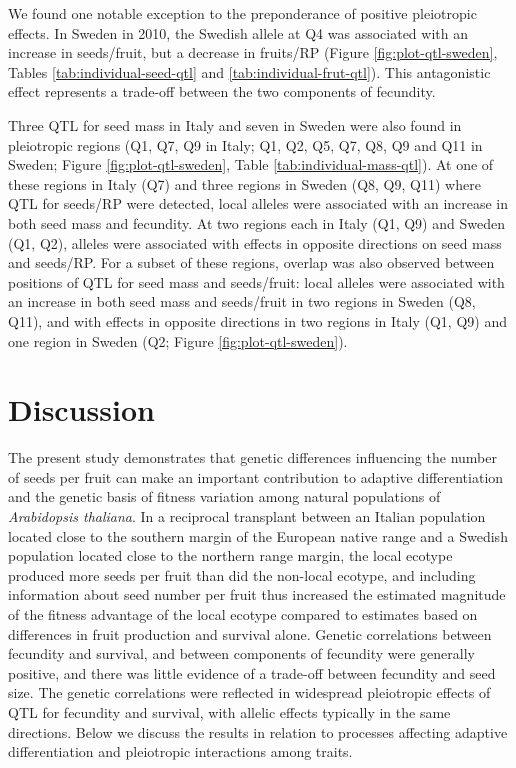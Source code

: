 \documentclass[]{article}
\begin{document}
We found one notable exception to the preponderance of positive pleiotropic effects. In Sweden in 2010, the Swedish allele at Q4 was associated with an increase in seeds/fruit, but a decrease in fruits/RP (Figure \ref{fig:plot-qtl-sweden}, Tables \ref{tab:individual-seed-qtl} and \ref{tab:individual-frut-qtl}). This antagonistic effect represents a trade-off between the two components of fecundity.

Three QTL for seed mass in Italy and seven in Sweden were also found in pleiotropic regions (Q1, Q7, Q9 in Italy; Q1, Q2, Q5, Q7, Q8, Q9 and Q11 in Sweden; Figure \ref{fig:plot-qtl-sweden}, Table \ref{tab:individual-mass-qtl}). At one of these regions in Italy (Q7) and three regions in Sweden (Q8, Q9, Q11) where QTL for seeds/RP were detected, local alleles were associated with an increase in both seed mass and fecundity. At two regions each in Italy (Q1, Q9) and Sweden (Q1, Q2), alleles were associated with effects in opposite directions on seed mass and seeds/RP. For a subset of these regions, overlap was also observed between positions of QTL for seed mass and seeds/fruit: local alleles were associated with an increase in both seed mass and seeds/fruit in two regions in Sweden (Q8, Q11), and with effects in opposite directions in two regions in Italy (Q1, Q9) and one region in Sweden (Q2; Figure \ref{fig:plot-qtl-sweden}).

\hypertarget{discussion}{%
\section{Discussion}\label{discussion}}

The present study demonstrates that genetic differences influencing the number of seeds per fruit can make an important contribution to adaptive differentiation and the genetic basis of fitness variation among natural populations of \emph{Arabidopsis thaliana}. In a reciprocal transplant between an Italian population located close to the southern margin of the European native range and a Swedish population located close to the northern range margin, the local ecotype produced more seeds per fruit than did the non-local ecotype, and including information about seed number per fruit thus increased the estimated magnitude of the fitness advantage of the local ecotype compared to estimates based on differences in fruit production and survival alone. Genetic correlations between fecundity and survival, and between components of fecundity were generally positive, and there was little evidence of a trade-off between fecundity and seed size. The genetic correlations were reflected in widespread pleiotropic effects of QTL for fecundity and survival, with allelic effects typically in the same directions. Below we discuss the results in relation to processes affecting adaptive differentiation and pleiotropic interactions among traits.
\end{document}

